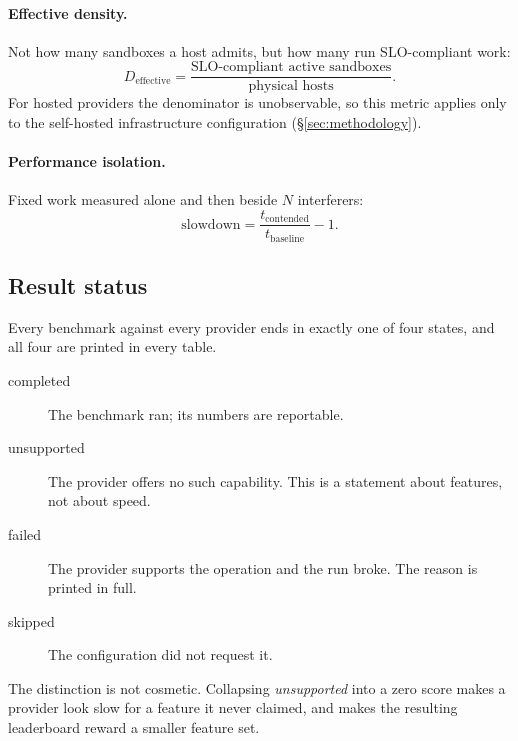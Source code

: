 \paragraph{Effective density.} Not how many sandboxes a host admits, but how
many run SLO-compliant work:
\[
  D_{\mathrm{effective}} =
  \frac{\text{SLO-compliant active sandboxes}}{\text{physical hosts}}.
\]
For hosted providers the denominator is unobservable, so this metric applies
only to the self-hosted infrastructure configuration
(\S\ref{sec:methodology}).

\paragraph{Performance isolation.} Fixed work measured alone and then beside
$N$ interferers:
\[
  \text{slowdown} = \frac{t_{\mathrm{contended}}}{t_{\mathrm{baseline}}} - 1 .
\]

\subsection{Result status}

Every benchmark against every provider ends in exactly one of four states, and
all four are printed in every table.

\begin{description}
  \item[completed] The benchmark ran; its numbers are reportable.
  \item[unsupported] The provider offers no such capability. This is a
  statement about features, not about speed.
  \item[failed] The provider supports the operation and the run broke. The
  reason is printed in full.
  \item[skipped] The configuration did not request it.
\end{description}

The distinction is not cosmetic. Collapsing \emph{unsupported} into a zero
score makes a provider look slow for a feature it never claimed, and makes the
resulting leaderboard reward a smaller feature set.
